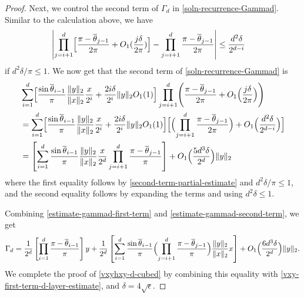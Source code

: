 \documentclass[11pt]{article}
\newcommand{\eps}{\epsilon}
\newcommand{\thetabar}{\overline{\theta}}
\newcommand{\bigPioned}{\prod_{i=1}^d}
\begin{document}
\begin{proof}
Next, we control the second term of $\Gamma_d$  in \eqref{soln-recurrence-Gammad}.
Similar to the calculation above, we have
\begin{align}
\left |   \prod_{j=i+1}^d \Bigl[\frac{\pi - \thetabar_{j-1}}{2\pi} + O_1(\frac{j \delta}{2 \pi}) \Bigr] - \prod_{j=i+1}^d \frac{\pi - \thetabar_{j-1}}{2\pi}    \right | & \leq \frac{d^2 \delta}{2^{d-i}} \label{second-term-partial-estimate}
\end{align}
if $d^2 \delta/\pi \leq 1$.   We now get that the second term of \eqref{soln-recurrence-Gammad} is
\begin{align}
&\sum_{i=1}^d \Bigl[ \frac{\sin \thetabar_{i-1}}{ \pi} \frac{\|y\|_2}{\|x\|_2} \frac{x}{2^i} + \frac{2 i \delta}{2^i} \|y\|_2 O_1(1) \Bigr] \prod_{j=i+1}^d \Biggl( \frac{\pi - \thetabar_{j-1}}{2\pi} + O_1 \Bigl(\frac{j \delta}{2\pi} \Bigr)    \Biggr) \notag\\
&= \sum_{i=1}^d \Bigl[ \frac{\sin \thetabar_{i-1}}{ \pi} \frac{\|y\|_2}{\|x\|_2} \frac{x}{2^i} + \frac{2 i \delta}{2^i} \|y\|_2 O_1(1) \Bigr] \Bigl[ \Bigl( \prod_{j=i+1}^d  \frac{\pi - \thetabar_{j-1}}{2\pi} \Bigr) +O_1\Bigl(\frac{d^2 \delta}{2^{d-i}}    \Bigr) \Bigr] \notag \\
&= \left[  \sum_{i=1}^d \frac{\sin\thetabar_{i-1}}{\pi} \frac{\|y\|_2}{\|x\|_2} \frac{x}{2^d} \prod_{j=i+1}^d \frac{\pi - \thetabar_{j-1}}{\pi} \right] + O_1\Bigl( \frac{5 d^3 \delta}{2^d}\Bigr) \|y\|_2 \label{estimate-gammad-second-term}
\end{align}
where the first equality follows by \eqref{second-term-partial-estimate} and $d^2 \delta / \pi \leq 1$, and the second equality follows by expanding the terms and using $d^2 \delta \leq 1$.

Combining \eqref{estimate-gammad-first-term} and \eqref{estimate-gammad-second-term}, we get
\begin{align*}
\Gamma_d = \frac{1}{2^d} \left[ \bigPioned \frac{\pi - \thetabar_{i-1}}{\pi} \right] y + \frac{1}{2^d} \left[ \sum_{i=1}^d \frac{\sin \thetabar_{i-1}}{\pi} \Bigl (\prod_{j=i+1}^d \frac{\pi - \thetabar_{j-1}}{\pi} \Bigr) \frac{\|y\|_2}{\|x\|_2} x \right ] + O_1\Bigl(\frac{6 d^3 \delta}{2^d} \Bigr) \|y\|_2. 
\end{align*}
We complete the proof of \eqref{vxyhxy-d-cubed} by combining this equality with \eqref{vxy-first-term-d-layer-estimate}, and $\delta = 4 \sqrt{\eps}$.

\end{proof}
\end{document}
